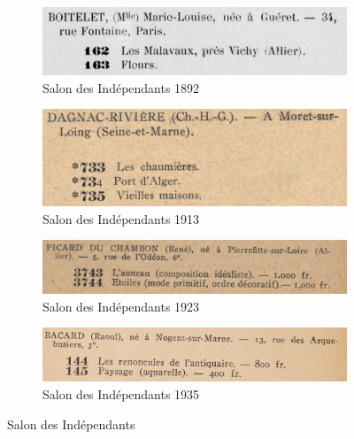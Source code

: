 \documentclass[a4paper,12pt,twoside]{book}
\begin{document}
	\begin{figure}
		\begin{subfigure}{0.5\textwidth}
			\includegraphics[scale=0.5]{inde1892.png}
			\centering
			\caption{Salon des Indépendants 1892}
		\end{subfigure}
		\begin{subfigure}{0.5\textwidth}
			\includegraphics[scale=0.5]{inde1913.png}
			\centering
			\caption{Salon des Indépendants 1913}
		\end{subfigure}
		\begin{subfigure}{0.5\textwidth}
			\includegraphics[scale=0.4]{inde1923.png}
			\centering
			\caption{Salon des Indépendants 1923}
		\end{subfigure}
		\begin{subfigure}{0.5\textwidth}
		\includegraphics[scale=0.5]{inde1935.png}
		\centering
		\caption{Salon des Indépendants 1935}
	\end{subfigure}
			\caption{Salon des Indépendants}
	\end{figure}
	
\end{document}
